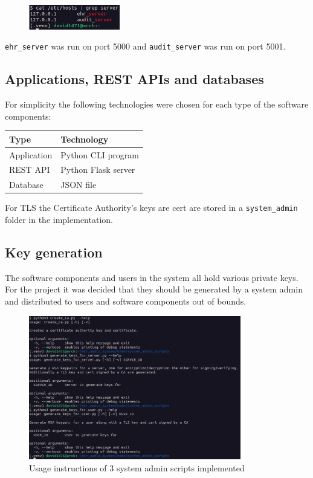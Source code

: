 \documentclass[11pt]{article}
\begin{document}
\begin{flushleft}
\begin{figure}[h!]
	\begin{center}
		\includegraphics[width = 150px]{images/dns_config.png}
	\end{center}
\end{figure}

\verb+ehr_server+ was run on port 5000 and \verb+audit_server+ was run on port 5001.

\subsection{Applications, REST APIs and databases}

For simplicity the following technologies were chosen for each type of the software components:

\begin{tabularx}{0.8\textwidth} { 
		| >{\raggedright\arraybackslash}X 
		| >{\raggedright\arraybackslash}X | }
	\hline
	\textbf{Type} & \textbf{Technology} \\
	\hline
	Application  & Python CLI program  \\
	\hline
	REST API  & Python Flask server  \\
	\hline
	Database  & JSON file  \\
	\hline
\end{tabularx}

For TLS the Certificate Authority's keys are cert are stored in a \verb+system_admin+ folder in the implementation.

\subsection{Key generation}

The software components and users in the system all hold various private keys. For the project it was decided that they should be generated by a system admin and distributed to users and software components out of bounds.

\begin{figure}[h!]
	\begin{center}
		\includegraphics[width = 350px]{images/system_admin_scripts.png}
		\caption{Usage instructions of 3 system admin scripts implemented}
	\end{center}
\end{figure}


\end{flushleft}
\end{document}
